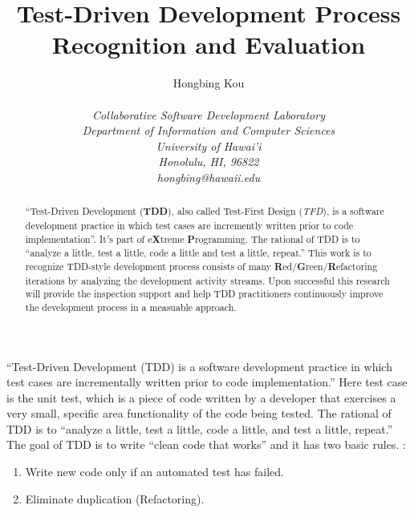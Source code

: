 \documentclass[11pt,twocolumn]{article}
\begin{document}
\title{Test-Driven Development Process Recognition and Evaluation}
\author{\protect\begin{tabular}{ccc}
Hongbing Kou\\
\end{tabular}\\
\em Collaborative Software Development Laboratory\\
\em Department of Information and Computer Sciences\\
\em University of Hawai'i\\
\em Honolulu, HI, 96822\\
\em hongbing@hawaii.edu}
\maketitle
\thispagestyle{empty}

\begin{abstract}
  ``Test-Driven Development (\textbf{TDD}), also called Test-First Design
  (\emph{TFD}), is a software development practice in which test cases are
  incremently written prior to code implementation\cite{George_2003}''.
  It's part of e\textbf{X}treme \textbf{P}rogramming. The rational of TDD is to
  ``analyze a little, test a little, code a little and test a little,
  repeat.'' This work is to recognize TDD-style development process
  consists of many \textbf{R}ed/\textbf{G}reen/\textbf{R}efactoring iterations by
  analyzing the development activity streams. Upon successful this research
  will provide the inspection support and help TDD practitioners
  continuously improve the development process in a measuable approach.
\end{abstract}

\label{sec:intro}

``Test-Driven Development (TDD) is a software development practice in which
test cases are incrementally written prior to code implementation.''
\cite{George_2003} Here test case is the unit test, which is a piece of
code written by a developer that exercises a very small, specific area
functionality of the code being tested. The rational of TDD is to ``analyze
a little, test a little, code a little, and test a little, repeat.'' The
goal of TDD is to write ``clean code that works''\cite{Beck_TDD_2003} and
it has two basic rules. \cite{Beck_TDD_2003}:

\begin{enumerate}
  \item Write new code only if an automated test has failed.
  \item Eliminate duplication (Refactoring).
\end{enumerate}
\end{document}
